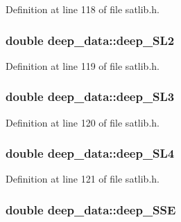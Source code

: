 Definition at line 118 of file satlib.\-h.

\hypertarget{structdeep__data_aafa3e6b122e44975ef5999af692723f6}{
\subsubsection[{deep\-\_\-\-S\-L2}]{\setlength{\rightskip}{0pt plus 5cm}double deep\-\_\-data\-::deep\-\_\-\-S\-L2}}\label{structdeep__data_aafa3e6b122e44975ef5999af692723f6}


Definition at line 119 of file satlib.\-h.

\hypertarget{structdeep__data_a78441198b323f7f43844112b75526f47}{
\subsubsection[{deep\-\_\-\-S\-L3}]{\setlength{\rightskip}{0pt plus 5cm}double deep\-\_\-data\-::deep\-\_\-\-S\-L3}}\label{structdeep__data_a78441198b323f7f43844112b75526f47}


Definition at line 120 of file satlib.\-h.

\hypertarget{structdeep__data_ac601da064b22841b0ccd0464f454e0aa}{
\subsubsection[{deep\-\_\-\-S\-L4}]{\setlength{\rightskip}{0pt plus 5cm}double deep\-\_\-data\-::deep\-\_\-\-S\-L4}}\label{structdeep__data_ac601da064b22841b0ccd0464f454e0aa}


Definition at line 121 of file satlib.\-h.

\hypertarget{structdeep__data_a257e06c1b69de9fe2acfc435107e6b74}{
\subsubsection[{deep\-\_\-\-S\-S\-E}]{\setlength{\rightskip}{0pt plus 5cm}double deep\-\_\-data\-::deep\-\_\-\-S\-S\-E}}\label{structdeep__data_a257e06c1b69de9fe2acfc435107e6b74}


